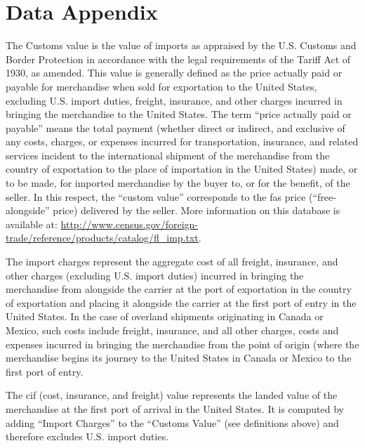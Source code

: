 \documentclass[a4paper,11pt]{article}
\begin{document}
\setcounter{table}{0}
\renewcommand{\thefigure}{A.\arabic{figure}}
\renewcommand{\thetable}{A.\arabic{table}}


\section{Data Appendix \label{app:data}}


The Customs value is the value of imports as appraised by the U.S. Customs and Border Protection in accordance with the legal requirements of the Tariff Act of 1930, as amended. This value is generally defined as the price actually paid or payable for merchandise when sold for exportation to the United States, excluding U.S. import duties, freight, insurance, and other charges incurred in bringing the merchandise to the United States. The term ``price actually paid or payable'' means the total payment (whether direct or indirect, and exclusive of any costs, charges, or expenses incurred for transportation, insurance, and related services incident to the international shipment of the merchandise from the country of exportation to the place of importation in the United States) made, or to be made, for imported merchandise by the buyer to, or for the benefit, of the seller. In this respect, the ``custom value'' corresponds to the fas price (``free-alongside'' price) delivered by the seller. More information on this database is available at: \url{http://www.census.gov/foreign-trade/reference/products/catalog/fl_imp.txt}.

The import charges represent the aggregate cost of all freight, insurance, and other charges (excluding U.S. import duties) incurred in bringing the merchandise from alongside the carrier at the port of exportation in the country of exportation and placing it alongside the carrier at the first port of entry in the United States. In the case of overland shipments originating in Canada or Mexico, such costs include freight, insurance, and all other charges, costs and expenses incurred in bringing the merchandise from the point of origin (where the merchandise begins its journey to the United States in Canada or Mexico to the first port of entry.

The cif (cost, insurance, and freight) value represents the landed value of the merchandise at the first port of arrival in the United States. It is computed by adding ``Import Charges'' to the ``Customs Value'' (see definitions above) and therefore excludes U.S. import duties.

\clearpage
\setcounter{table}{0}
\setcounter{figure}{0}
\renewcommand{\thefigure}{B.\arabic{figure}}
\renewcommand{\thetable}{B.\arabic{table}}
\end{document}
